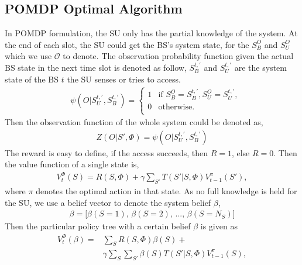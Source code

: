 \documentclass[conference]{IEEEtran}
\begin{document}
\subsection{POMDP Optimal Algorithm}
In POMDP formulation, the SU only has the partial knowledge of the system.
At the end of each slot, the SU could get the BS's system state, 
for the \(S_B^O\) and \(S_U^O\) which we use \(\mathcal{O}\) to denote.
The observation probability function given the actual BS state in the next time slot is denoted as follow,
\(S_B^{t,'}\) and \(S_U^{t,'}\) are the system state of the BS \(t\) the SU senses or tries to access.
\begin{align}
	&\psi\left(O|S_U^{t,'}, S_B^{t,'}\right) = 
	\begin{cases} 
		1 &\mbox{if $S_B^O = S_B^{t,'}, S_U^O=S_U^{t,'}$,}\\
		0 &\mbox{otherwise.}\\
\end{cases}
\end{align}
Then the observation function of the whole system could be denoted as,
\begin{align}\label{transition}
	Z\left(O|S',\Phi\right) = \psi\left(O|S_U^{t,'}, S_B^{t,'}\right)
\end{align}
The reward is easy to define, if the access succeeds, then \(R = 1\), else \(R= 0\).
Then the value function of a single state is, 
\begin{equation}
\begin{aligned}
	V_t^\Phi\left(S\right) = R\left(S,\Phi\right) +\gamma\sum\limits_{S'}T\left(S'|S,\Phi\right)V_{t-1}^\pi\left(S'\right),
\end{aligned}%
\end{equation}
where \(\pi\) denotes the optimal action in that state.
As no full knowledge is held for the SU, we use a belief vector to denote the system belief \(\beta\),
\begin{align}
	\beta = \lbrack \beta\left(S = 1\right),\,\beta\left(S = 2\right),\,...,\,\beta\left(S = N_S\right)\rbrack	
\end{align}
Then the particular policy tree with a certain belief \(\beta\) is given as
\begin{equation}
\begin{aligned}
	V_t^\Phi\left(\beta\right) = & \sum\limits_{S}R\left(S,\Phi\right)\beta\left(S\right) +\\
	&	\gamma\sum\limits_{S}\sum\limits_{S'}\beta\left(S\right)T\left(S'|S,\Phi\right)V_{t-1}^\pi\left(S\right),
\end{aligned}
\end{equation}
\end{document}
